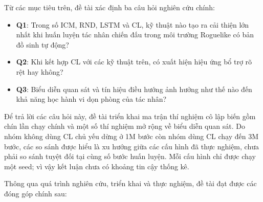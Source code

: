 \vspace{0.5cm}

Từ các mục tiêu trên, đề tài xác định ba câu hỏi nghiên cứu chính:

\renewcommand{\labelitemi}{$-$}
\begin{itemize}
    \item \textbf{Q1}: Trong số ICM, RND, LSTM và CL, kỹ thuật nào tạo ra cải thiện lớn nhất khi huấn luyện tác nhân chiến đấu trong môi trường Roguelike có bản đồ sinh tự động?
    \item \textbf{Q2}: Khi kết hợp CL với các kỹ thuật trên, có xuất hiện hiệu ứng bổ trợ rõ rệt hay không?
    \item \textbf{Q3}: Biểu diễn quan sát và tín hiệu điều hướng ảnh hưởng như thế nào đến khả năng học hành vi dọn phòng của tác nhân?
\end{itemize}

Để trả lời các câu hỏi này, đề tài triển khai ma trận thí nghiệm cô lập biến gồm chín lần chạy chính và một số thí nghiệm mở rộng về biểu diễn quan sát. Do nhóm không dùng CL chủ yếu dừng ở 1M bước còn nhóm dùng CL chạy đến 3M bước, các so sánh được hiểu là xu hướng giữa các cấu hình đã thực nghiệm, chưa phải so sánh tuyệt đối tại cùng số bước huấn luyện. Mỗi cấu hình chỉ được chạy một seed; vì vậy kết luận chưa có khoảng tin cậy thống kê.

\vspace{0.3cm}


Thông qua quá trình nghiên cứu, triển khai và thực nghiệm, đề tài đạt được các đóng góp chính sau:

